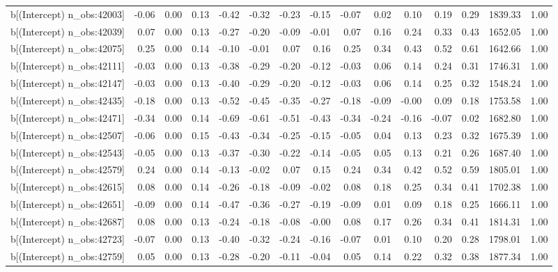 \begin{table}[ht]
\begin{tabular}{rrrrrrrrrrrrrrr}
  b[(Intercept) n\_obs:42003] & -0.06 & 0.00 & 0.13 & -0.42 & -0.32 & -0.23 & -0.15 & -0.07 & 0.02 & 0.10 & 0.19 & 0.29 & 1839.33 & 1.00 \\ 
  b[(Intercept) n\_obs:42039] & 0.07 & 0.00 & 0.13 & -0.27 & -0.20 & -0.09 & -0.01 & 0.07 & 0.16 & 0.24 & 0.33 & 0.43 & 1652.05 & 1.00 \\ 
  b[(Intercept) n\_obs:42075] & 0.25 & 0.00 & 0.14 & -0.10 & -0.01 & 0.07 & 0.16 & 0.25 & 0.34 & 0.43 & 0.52 & 0.61 & 1642.66 & 1.00 \\ 
  b[(Intercept) n\_obs:42111] & -0.03 & 0.00 & 0.13 & -0.38 & -0.29 & -0.20 & -0.12 & -0.03 & 0.06 & 0.14 & 0.24 & 0.31 & 1746.31 & 1.00 \\ 
  b[(Intercept) n\_obs:42147] & -0.03 & 0.00 & 0.13 & -0.40 & -0.29 & -0.20 & -0.12 & -0.03 & 0.06 & 0.14 & 0.25 & 0.32 & 1548.24 & 1.00 \\ 
  b[(Intercept) n\_obs:42435] & -0.18 & 0.00 & 0.13 & -0.52 & -0.45 & -0.35 & -0.27 & -0.18 & -0.09 & -0.00 & 0.09 & 0.18 & 1753.58 & 1.00 \\ 
  b[(Intercept) n\_obs:42471] & -0.34 & 0.00 & 0.14 & -0.69 & -0.61 & -0.51 & -0.43 & -0.34 & -0.24 & -0.16 & -0.07 & 0.02 & 1682.80 & 1.00 \\ 
  b[(Intercept) n\_obs:42507] & -0.06 & 0.00 & 0.15 & -0.43 & -0.34 & -0.25 & -0.15 & -0.05 & 0.04 & 0.13 & 0.23 & 0.32 & 1675.39 & 1.00 \\ 
  b[(Intercept) n\_obs:42543] & -0.05 & 0.00 & 0.13 & -0.37 & -0.30 & -0.22 & -0.14 & -0.05 & 0.05 & 0.13 & 0.21 & 0.26 & 1687.40 & 1.00 \\ 
  b[(Intercept) n\_obs:42579] & 0.24 & 0.00 & 0.14 & -0.13 & -0.02 & 0.07 & 0.15 & 0.24 & 0.34 & 0.42 & 0.52 & 0.59 & 1805.01 & 1.00 \\ 
  b[(Intercept) n\_obs:42615] & 0.08 & 0.00 & 0.14 & -0.26 & -0.18 & -0.09 & -0.02 & 0.08 & 0.18 & 0.25 & 0.34 & 0.41 & 1702.38 & 1.00 \\ 
  b[(Intercept) n\_obs:42651] & -0.09 & 0.00 & 0.14 & -0.47 & -0.36 & -0.27 & -0.19 & -0.09 & 0.01 & 0.09 & 0.18 & 0.25 & 1666.11 & 1.00 \\ 
  b[(Intercept) n\_obs:42687] & 0.08 & 0.00 & 0.13 & -0.24 & -0.18 & -0.08 & -0.00 & 0.08 & 0.17 & 0.26 & 0.34 & 0.41 & 1814.31 & 1.00 \\ 
  b[(Intercept) n\_obs:42723] & -0.07 & 0.00 & 0.13 & -0.40 & -0.32 & -0.24 & -0.16 & -0.07 & 0.01 & 0.10 & 0.20 & 0.28 & 1798.01 & 1.00 \\ 
  b[(Intercept) n\_obs:42759] & 0.05 & 0.00 & 0.13 & -0.28 & -0.20 & -0.11 & -0.04 & 0.05 & 0.14 & 0.22 & 0.32 & 0.38 & 1877.34 & 1.00 \\ 

\end{tabular}
\end{table}

